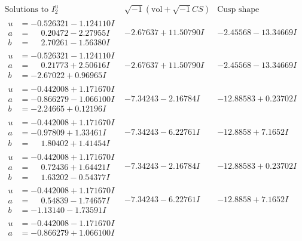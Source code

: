\documentclass[1p]{elsarticle_modified}
\theoremstyle{definition}
\newcommand{\I}{\sqrt{-1}}
\begin{document}
$$\begin{array}{c|c|c}
\text{Solutions to }I^u_{2}& \I (\text{vol} + \sqrt{-1}CS) & \text{Cusp shape}\\
 \hline 
\begin{aligned}
u &= -0.526321 - 1.124110 I \\
a &= \phantom{-}0.20472 - 2.27955 I \\
b &= \phantom{-}2.70261 - 1.56380 I\end{aligned}
 & -2.67637 + 11.50790 I & -2.45568 - 13.34669 I \\ \hline\begin{aligned}
u &= -0.526321 - 1.124110 I \\
a &= \phantom{-}0.21773 + 2.50616 I \\
b &= -2.67022 + 0.96965 I\end{aligned}
 & -2.67637 + 11.50790 I & -2.45568 - 13.34669 I \\ \hline\begin{aligned}
u &= -0.442008 + 1.171670 I \\
a &= -0.866279 - 1.066100 I \\
b &= -2.24665 + 0.12196 I\end{aligned}
 & -7.34243 - 2.16784 I & -12.88583 + 0.23702 I \\ \hline\begin{aligned}
u &= -0.442008 + 1.171670 I \\
a &= -0.97809 + 1.33461 I \\
b &= \phantom{-}1.80402 + 1.41454 I\end{aligned}
 & -7.34243 - 6.22761 I & -12.8858 + 7.1652 I \\ \hline\begin{aligned}
u &= -0.442008 + 1.171670 I \\
a &= \phantom{-}0.72436 + 1.64421 I \\
b &= \phantom{-}1.63202 - 0.54377 I\end{aligned}
 & -7.34243 - 2.16784 I & -12.88583 + 0.23702 I \\ \hline\begin{aligned}
u &= -0.442008 + 1.171670 I \\
a &= \phantom{-}0.54839 - 1.74657 I \\
b &= -1.13140 - 1.73591 I\end{aligned}
 & -7.34243 - 6.22761 I & -12.8858 + 7.1652 I \\ \hline\begin{aligned}
u &= -0.442008 - 1.171670 I \\
a &= -0.866279 + 1.066100 I \\

\end{aligned}
\end{array}$$
\end{document}
